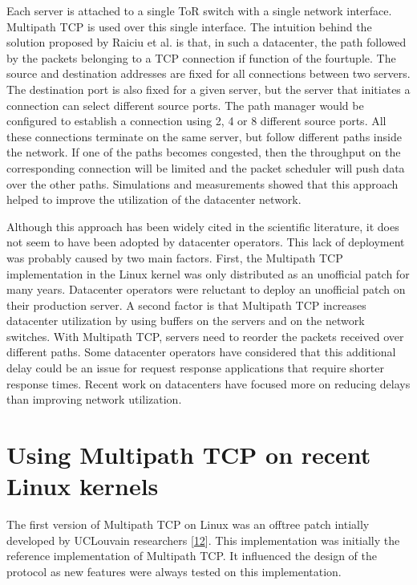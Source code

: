 \documentclass[letterpaper,10pt,english]{sphinxmanual}
\begin{document}
\sphinxAtStartPar
Each server is attached to a single ToR switch with a single network interface. Multipath TCP is used over this single interface. The intuition behind the solution proposed by Raiciu et al. is that, in such a datacenter, the path followed by the packets belonging to a TCP connection if function of the four\sphinxhyphen{}tuple. The source and destination addresses are fixed for all connections between two servers. The destination port is also fixed for a given server, but the server that initiates a connection can select different source ports. The path manager would be configured to establish a connection using 2, 4 or 8 different source ports. All these connections terminate on the same server, but follow different paths inside the network. If one of the paths becomes congested, then the throughput on the corresponding connection will be limited and the packet scheduler will push data over the other paths. Simulations and measurements showed that this approach helped to improve the utilization of the datacenter network.

\sphinxAtStartPar
Although this approach has been widely cited in the scientific literature, it does not seem to have been adopted by datacenter operators. This lack of deployment was probably caused by two main factors. First, the Multipath TCP implementation in the Linux kernel was only distributed as an unofficial patch for many years. Datacenter operators were reluctant to deploy an unofficial patch on their production server. A second factor is that Multipath TCP increases datacenter utilization by using buffers on the servers and on the network switches. With Multipath TCP, servers need to reorder the packets received over different paths. Some datacenter operators have considered that this additional delay could be an issue for request response applications that require shorter response times. Recent work on datacenters have focused more on reducing delays than improving network utilization.


\chapter{Using Multipath TCP on recent Linux kernels}
\label{\detokenize{mptcp-linux:using-multipath-tcp-on-recent-linux-kernels}}\label{\detokenize{mptcp-linux::doc}}
\sphinxAtStartPar
The first version of Multipath TCP on Linux was an off\sphinxhyphen{}tree patch intially developed by UCLouvain researchers {[}\hyperlink{cite.biblio:id8926}{12}{]}. This implementation was initially the reference implementation of Multipath TCP. It influenced the design of the protocol as new features were always tested on this implementation.
\end{document}
